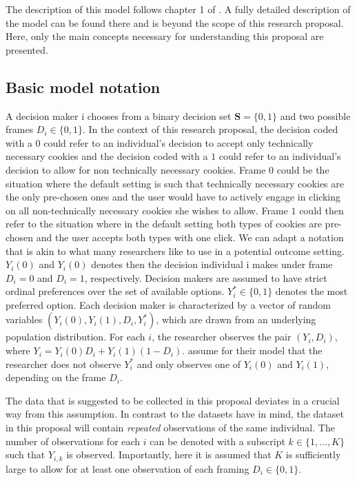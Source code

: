 The description of this model follows chapter 1 of \textcite{goldin2020}. A fully detailed description 
of the model can be found there and is beyond the scope of this research proposal. Here, only the main concepts 
necessary for understanding this proposal are presented.

\subsection{Basic model notation}\label{basic notation}

A decision maker i chooses from a binary decision set $ \textbf{S} = \lbrace 0,1 \rbrace  $ and two possible frames $ D_{i} \in \lbrace 0,1 \rbrace $. 
In the context of this research proposal, the decision coded with a $0$ 
could refer to an individual's decision to accept only technically necessary cookies and 
the decision coded with a $ 1 $ could refer to an individual's decision 
to allow for non technically necessary cookies. Frame $ 0 $ could be the situation where the default setting is such that 
technically necessary cookies are the only pre-chosen ones and the user would have to actively engage in clicking on all non-technically necessary 
cookies she wishes to allow. Frame $ 1 $ could then refer to the situation 
where in the default setting both types of cookies are pre-chosen and the user accepts both types with one click. We can adapt a notation that is akin to what many researchers like to use in a potential outcome setting. $ Y_{i}(0) $ and $ Y_{i}(0) $ denotes then the decision individual i makes under frame $ D_{i} = 0 $ and $ D_{i} = 1 $, respectively.
Decision makers are assumed to have strict ordinal preferences over the set of available options. $ Y^{*}_{i} \in \lbrace 0,1 \rbrace $ denotes the most preferred option.
Each decision maker is characterized by a vector of random variables 
$ (Y_i(0), Y_i(1), D_i, Y^*_i) $, which are drawn from an underlying population distribution.
For each $ i $, the researcher observes the pair $ (Y_i, D_i) $, where 
$ Y_i = Y_i(0)D_i + Y_i(1)(1-D_i)$. \textcite{goldin2020} assume for their model 
that the researcher does not observe $ Y^*_i $ and only observes one of $ Y_i(0)$ and $ Y_i(1)$, depending on the frame $D_i$.

The data that is suggested to be collected in this proposal deviates
in a crucial way from this assumption. In contrast to the datasets \textcite{goldin2020}
have in mind, the dataset in this proposal will contain \textit{repeated} observations of the same individual. 
The number of observations for each $ i $ can be denoted with a subscript 
$ k \in \lbrace 1,\dots, K \rbrace $ such that $ Y_{i, k} $ is observed. 
Importantly, here it is assumed that $ K $ is sufficiently large to allow for at 
least one observation of each framing $ D_{i} \in \lbrace 0,1 \rbrace $.

